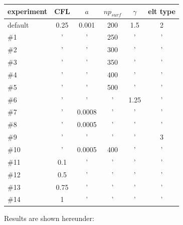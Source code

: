 \begin{tabular}{lccccc}
\hline
experiment &  CFL   &  $a$   & $np_{surf}$ & $\gamma$ & elt type \\
\hline
\hline
default    &  0.25  &  0.001 & 200         & 1.5      &  2        \\
\#1        &  '     &    '   & 250         & '        &  '        \\
\#2        &  '     &    '   & 300         & '        &  '        \\
\#3        &  '     &    '   & 350         & '        &  '        \\
\#4        &  '     &    '   & 400         & '        &  '        \\
\#5        &  '     &    '   & 500         & '        &  '        \\
\#6        &  '     &    '   & '           & 1.25     &  '        \\
\#7        &  '     & 0.0008 & '           & '        &  '        \\
\#8        &  '     & 0.0005 & '           & '        &  '        \\
\#9        &  '     &    '   & '           & '        &  3        \\
\#10       &  '     & 0.0005 & 400         & '        &  '        \\
\#11       &  0.1   &    '   & '           & '        &  '        \\
\#12       &  0.5   &    '   & '           & '        &  '        \\
\#13       &  0.75  &    '   & '           & '        &  '        \\
\#14       &  1     &    '   & '           & '        &  '        \\
\hline
\end{tabular}

Results are shown hereunder:

